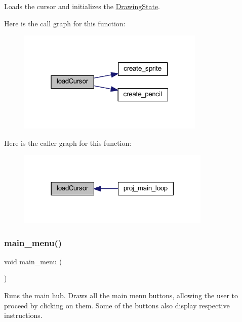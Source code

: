 Loads the cursor and initializes the \mbox{\hyperlink{struct_drawing_state}{Drawing\+State}}. 

Here is the call graph for this function\+:\nopagebreak
\begin{figure}[H]
\begin{center}
\leavevmode
\includegraphics[width=253pt]{group__pengoo_ga099795341d84ce8caa2e79aeccfff34f_cgraph}
\end{center}
\end{figure}
Here is the caller graph for this function\+:\nopagebreak
\begin{figure}[H]
\begin{center}
\leavevmode
\includegraphics[width=261pt]{group__pengoo_ga099795341d84ce8caa2e79aeccfff34f_icgraph}
\end{center}
\end{figure}
\mbox{\label{group__pengoo_ga885611589f6294afada89fe88362e863}} 
\subsubsection{\texorpdfstring{main\+\_\+menu()}{main\_menu()}}
{\footnotesize\ttfamily void main\+\_\+menu (\begin{DoxyParamCaption}{ }\end{DoxyParamCaption})}



Runs the main hub. Draws all the main menu buttons, allowing the user to proceed by clicking on them. Some of the buttons also display respective instructions. 

